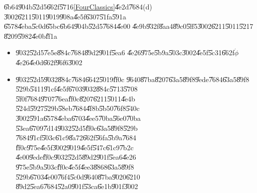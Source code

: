 \U{6b64}\U{904b}\U{52d5}\U{662f}\U{5716}\ref{FourClassics}\U{4e2d}\U{7684}(d)%
\U{3002}\U{6211}\U{5011}\U{9019}\U{908a}\U{4e5f}\U{6307}\U{51fa}\U{591a}%
\U{6578}\U{4eba}\U{5c0d}\U{65bc}\U{6b64}\U{904b}\U{52d5}\U{7684}\U{4e00}%
\U{4e9b}\U{932f}\U{8aa4}\U{89c0}\U{5ff5}\U{3002}\U{6211}\U{5011}\U{5217}%
\U{8209}\U{5982}\U{4e0b}\U{ff1a}

\begin{itemize}
\item \U{9032}\U{52d5}\U{7e5e}\U{884c}\U{7684}\U{89d2}\U{901f}\U{5ea6}%
\U{4e26}\U{975e}\U{5b9a}\U{503c}\U{3002}\U{4e5f}\U{5c31}\U{662f}$\dot{\phi}$%
\U{4e26}\U{4e0d}\U{662f}\U{96f6}\U{3002}

\item \U{9032}\U{52d5}\U{9032}\U{884c}\U{7684}\U{6642}\U{5019}\U{ff0c}%
\U{9640}\U{87ba}\U{8207}\U{63a5}\U{89f8}\U{9ede}\U{7684}\U{63a5}\U{89f8}%
\U{529b}\U{5411}\U{91cf}\U{4e5f}\U{6703}\U{9032}\U{884c}\U{5713}\U{5708}%
\U{5f0f}\U{7684}\U{9707}\U{76ea}\U{ff0c}\U{8207}\U{6211}\U{5011}\U{4e4b}%
\U{524d}\U{5927}\U{529b}\U{58eb}\U{7684}\U{4f8b}\U{5b50}\U{76f8}\U{540c}%
\U{3002}\U{591a}\U{6578}\U{4eba}\U{6703}\U{4ee5}\U{70ba}\U{56e0}\U{70ba}%
\U{53ea}\U{6709}\U{7d14}\U{9032}\U{52d5}\U{ff0c}\U{63a5}\U{89f8}\U{529b}%
\U{7684}\U{91cf}\U{503c}\U{61c9}\U{8a72}\U{662f}\U{56fa}\U{5b9a}\U{7684}%
\U{ff0c}\U{975e}\U{4e5f}\U{3002}\U{9019}\U{4e5f}\U{547c}\U{61c9}\U{7b2c}%
\U{4e00}\U{9ede}\U{ff0c}\U{9032}\U{52d5}\U{89d2}\U{901f}\U{5ea6}\U{4e26}%
\U{975e}\U{5b9a}\U{503c}\U{ff0c}\U{4e5f}\U{4ee3}\U{8868}\U{63a5}\U{89f8}%
\U{529b}\U{6703}\U{4e00}\U{76f4}\U{5c0d}\U{9640}\U{87ba}\U{9020}\U{6210}%
\U{89d2}\U{5ea6}\U{7684}\U{52a0}\U{901f}\U{53ca}\U{6e1b}\U{901f}\U{3002}
\end{itemize}


